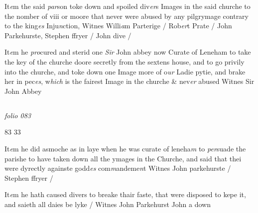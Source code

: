 \documentclass[12pt, a4paper]{book}
\begin{document}
	
		\ifthenelse{\isodd{\thepage}}
		{\reversemarginpar}
		{\normalmarginpar}
		It\textit{e}m the said \textit{par}son toke down and spoiled div\textit{er}s Images
  in the said churche to the nomber of viii or moore that
 never were abused by any pilgrymage contrary to
 the king\textit{es} Inju\textit{n}ction, Witnes Willi\textit{a}m Parterige / Rob\textit{er}t
 	Prate / John Parkehurste, Stephen ffryer / John
 dive /
	
		\ifthenelse{\isodd{\thepage}}
		{\reversemarginpar}
		{\normalmarginpar}
		It\textit{e}m he \textit{pro}cured and sterid one \textit{Sir} John abbey now Curate of
 Leneham to take the key of the churche doore secretly from
 the sextens house, and to go privily into the churche, and
 toke down one Image more of o\textit{ur} Ladie pytie, and brake her
 in pec\textit{es}, w\textit{hich} is the fairest Image in the churche \& nev\textit{er} abused
		Witnes Sir John Abbey
 


\dotfill
						\newpage {} \subsection*{}

\textit{folio 083}


\begin{flushright}{\color{Mahogany}83} 33\end{flushright}

		\ifthenelse{\isodd{\thepage}}
		{\reversemarginpar}
		{\normalmarginpar}
		 It\textit{e}m he did asmoche as in laye when he was curate of leneha\textit{m}
 to \textit{per}suade the parishe to have taken down all the ymages in the
 Churche, and said that thei were dyrectly againste godd\textit{es} com\textit{m}andeme\textit{n}t
	Witnes John parkehurste / Stephen ffryer /

	
			
	
				\marginpar[\vspace{0.5cm}{\textcolor{Gray}{fastynge dayes}}]{}
			
	
		\ifthenelse{\isodd{\thepage}}
		{\reversemarginpar}
		{\normalmarginpar}
		It\textit{e}m he hath caused divers to breake thair faste, that were disposed
		to kepe it, and saieth all daies be lyke / Witnes John Parkehurst
		John a down
 
\end{document}
